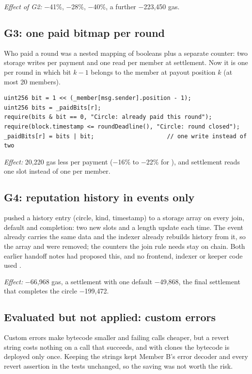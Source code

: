 \emph{Effect of G2:}  $-$41\%,  $-$28\%,  $-$40\%,
 a further $-$223,450 gas.

\subsection{G3: one paid bitmap per round}
Who paid a round was a nested mapping of booleans plus a separate counter: two storage writes per
payment and one read per member at settlement. Now it is one  per round in which bit
$k-1$ belongs to the member at payout position $k$ (at most 20 members).

\begin{lstlisting}[language=Solidity]
uint256 bit = 1 << (_member[msg.sender].position - 1);
uint256 bits = _paidBits[r];
require(bits & bit == 0, "Circle: already paid this round");
require(block.timestamp <= roundDeadline(), "Circle: round closed");
_paidBits[r] = bits | bit;                     // one write instead of two
\end{lstlisting}

\emph{Effect:} 20,220 gas less per payment ($-$16\% to $-$22\% for ), and settlement
reads one slot instead of one per member.

\subsection{G4: reputation history in events only}
 pushed a history entry (circle, kind, timestamp) to a storage array on every
join, default and completion: two new slots and a length update each time. The
 event already carries the same data and the indexer already rebuilds history
from it, so the array and  were removed; the counters the join rule needs stay on
chain. Both earlier handoff notes had proposed this, and no frontend, indexer or keeper code used
.

\emph{Effect:}  $-$66,968 gas, a settlement with one default $-$49,868, the final settlement
that completes the circle $-$199,472.

\subsection{Evaluated but not applied: custom errors}
Custom errors make bytecode smaller and failing calls cheaper, but a revert string costs nothing on a
call that succeeds, and with clones the bytecode is deployed only once. Keeping the strings kept
Member B's error decoder and every revert assertion in the tests unchanged, so the saving was not
worth the risk.

